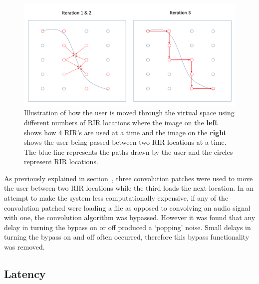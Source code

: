 \documentclass[../../main.tex]{subfiles}
\begin{document}
		\begin{figure}[H]
			\centerline{\includegraphics[scale = 0.4]{Sections/Implementation/Max/images/Max/iterationMovement.png}}
			\caption{Illustration of how the user is moved through the virtual space using different numbers of \ac{RIR} locations where the image on the \textbf{left} shows how 4 \ac{RIR}'s are used at a time and the image on the \textbf{right}  shows the user being passed between two \ac{RIR} locations at a time. The blue line represents the paths drawn by the user and the circles represent \ac{RIR} locations.}
			\label{iterationMovement}
		\end{figure}



		As previously explained in section~, three convolution patches were used to move the user between two \ac{RIR} locations while the third loads the next location. In an attempt to make the system less computationally expensive, if any of the convolution patched were loading a file as opposed to convolving an audio signal with one, the convolution algorithm was bypassed. However it was found that any delay in turning the bypass on or off produced a `popping' noise. Small delays in turning the bypass on and off often occurred, therefore this bypass functionality was removed.


	\subsection{Latency}
\end{document}
